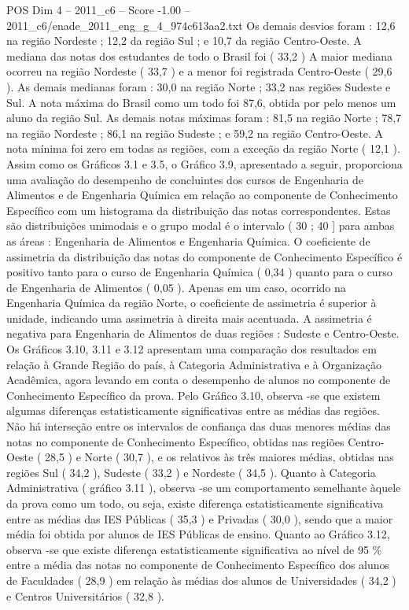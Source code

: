 \begin{textsample}{POS Dim 4 – 2011\_c6 – Score -1.00 – 2011\_c6/enade\_2011\_eng\_g\_4\_974c613aa2.txt}
Os demais desvios foram : 12,6 na região Nordeste ; 12,2 da região Sul ; e 10,7 da região Centro-Oeste.
A mediana das notas dos estudantes de todo o Brasil foi ( 33,2 ) A maior mediana ocorreu na região Nordeste ( 33,7 ) e a menor foi registrada Centro-Oeste ( 29,6 ).
As demais medianas foram : 30,0 na região Norte ; 33,2 nas regiões Sudeste e Sul.
A nota máxima do Brasil como um todo foi 87,6, obtida por pelo menos um aluno da região Sul.
As demais notas máximas foram : 81,5 na região Norte ; 78,7 na região Nordeste ; 86,1 na região Sudeste ; e 59,2 na região Centro-Oeste.
A nota mínima foi zero em todas as regiões, com a exceção da região Norte ( 12,1 ).
Assim como os Gráficos 3.1 e 3.5, o Gráfico 3.9, apresentado a seguir, proporciona uma avaliação do desempenho de concluintes dos cursos de Engenharia de Alimentos e de Engenharia Química em relação ao componente de Conhecimento Específico com um histograma da distribuição das notas correspondentes.
Estas são distribuições unimodais e o grupo modal é o intervalo ( 30 ; 40 ] para ambas as áreas : Engenharia de Alimentos e Engenharia Química.
O coeficiente de assimetria da distribuição das notas do componente de Conhecimento Específico é positivo tanto para o curso de Engenharia Química ( 0,34 ) quanto para o curso de Engenharia de Alimentos ( 0,05 ).
Apenas em um caso, ocorrido na Engenharia Química da região Norte, o coeficiente de assimetria é superior à unidade, indicando uma assimetria à direita mais acentuada.
A assimetria é negativa para Engenharia de Alimentos de duas regiões : Sudeste e Centro-Oeste.
Os Gráficos 3.10, 3.11 e 3.12 apresentam uma comparação dos resultados em relação à Grande Região do país, à Categoria Administrativa e à Organização Acadêmica, agora levando em conta o desempenho de alunos no componente de Conhecimento Específico da prova.
Pelo Gráfico 3.10, observa -se que existem algumas diferenças estatisticamente significativas entre as médias das regiões.
Não há interseção entre os intervalos de confiança das duas menores médias das notas no componente de Conhecimento Específico, obtidas nas regiões Centro-Oeste ( 28,5 ) e Norte ( 30,7 ), e os relativos às três maiores médias, obtidas nas regiões Sul ( 34,2 ), Sudeste ( 33,2 ) e Nordeste ( 34,5 ).
Quanto à Categoria Administrativa ( gráfico 3.11 ), observa -se um comportamento semelhante àquele da prova como um todo, ou seja, existe diferença estatisticamente significativa entre as médias das IES Públicas ( 35,3 ) e Privadas ( 30,0 ), sendo que a maior média foi obtida por alunos de IES Públicas de ensino.
Quanto ao Gráfico 3.12, observa -se que existe diferença estatisticamente significativa ao nível de 95 \% entre a média das notas no componente de Conhecimento Específico dos alunos de Faculdades ( 28,9 ) em relação às médias dos alunos de Universidades ( 34,2 ) e Centros Universitários ( 32,8 ).

\end{textsample}
